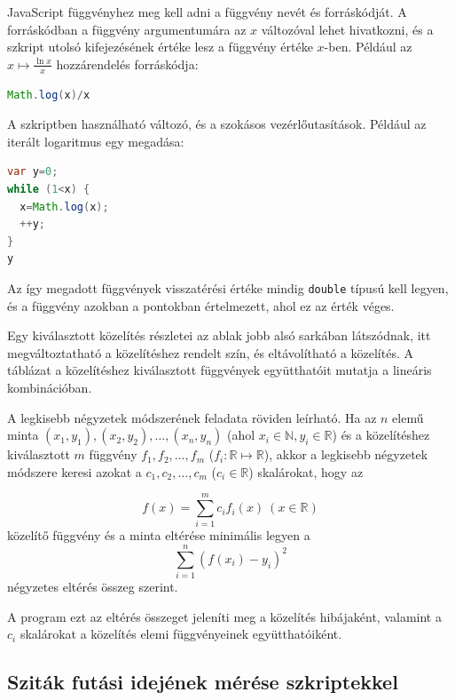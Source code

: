 JavaScript függvényhez meg kell adni a függvény nevét és forráskódját.
A forráskódban a függvény argumentumára az $x$ változóval lehet hivatkozni, és a szkript utolsó kifejezésének értéke lesz a függvény értéke $x$-ben.
Például az $x \mapsto \frac{\ln{x}}{x}$ hozzárendelés forráskódja:

\begin{lstlisting}[basicstyle=\small\ttfamily, language=Java]
Math.log(x)/x
\end{lstlisting}

A szkriptben használható változó, és a szokásos vezérlőutasítások.
Például az iterált logaritmus egy megadása:
\begin{lstlisting}[basicstyle=\small\ttfamily, language=Java, morekeywords=var]
var y=0;
while (1<x) {
  x=Math.log(x);
  ++y;
}
y
\end{lstlisting}

Az így megadott függvények visszatérési értéke mindig \texttt{double} típusú kell legyen,
és a függvény azokban a pontokban értelmezett, ahol ez az érték véges.

Egy kiválasztott közelítés részletei az ablak jobb alsó sarkában látszódnak, itt megváltoztatható a közelítéshez rendelt szín, és eltávolítható a közelítés.
A táblázat a közelítéshez kiválasztott függvények együtthatóit mutatja a lineáris kombinációban.

A legkisebb négyzetek módszerének feladata röviden leírható.
Ha az $n$ elemű minta $(x_1, y_1), (x_2, y_2), \ldots, (x_n, y_n)$ (ahol $x_i \in \mathbb{N}, y_i \in \mathbb{R}$) és a közelítéshez kiválasztott $m$ függvény $f_1, f_2, \ldots, f_m$ ($f_i:\mathbb{R} \mapsto \mathbb{R}$), akkor a legkisebb négyzetek módszere keresi azokat a $c_1, c_2, \ldots, c_m$ ($c_i \in \mathbb{R}$) skalárokat, hogy az

\begin{equation*}
f(x)=\sum_{i=1}^m c_i f_i(x)\ (x \in \mathbb{R})
\end{equation*}
közelítő függvény és a minta eltérése minimális legyen a
\begin{equation*}
\sum_{i=1}^{n} (f(x_i)-y_i)^2
\end{equation*}
négyzetes eltérés összeg szerint.

A program ezt az eltérés összeget jeleníti meg a közelítés hibájaként, valamint a $c_i$ skalárokat a közelítés elemi függvényeinek együtthatóiként.

\subsection{Sziták futási idejének mérése szkriptekkel}

